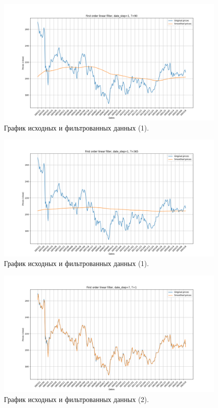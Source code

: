 \documentclass[a4paper, 12pt]{article}
\begin{document}
    \begin{figure}[H]
        \centering
        \includegraphics[scale=0.35]{1_90.png}
        \captionsetup{skip=0pt}
        \caption{График исходных и фильтрованных данных (1).}
        \label{fig:90}
    \end{figure}
    \begin{figure}[H]
        \centering
        \includegraphics[scale=0.35]{1_365.png}
        \captionsetup{skip=0pt}
        \caption{График исходных и фильтрованных данных (1).}
        \label{fig:365}
    \end{figure}
    \begin{figure}[H]
        \centering
        \includegraphics[scale=0.35]{2_1.png}
        \captionsetup{skip=0pt}
        \caption{График исходных и фильтрованных данных (2).}
        \label{fig:112}
    \end{figure}
\end{document}
